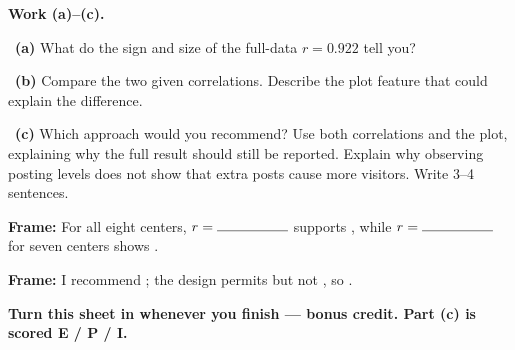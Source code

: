 \documentclass[11pt]{article}
\begin{document}
\newpage
\textbf{Work (a)--(c).}\par\smallskip

~\textbf{(a)} What do the sign and size of the full-data $r=0.922$ tell you?\par
\workspace{0.55in}

~\textbf{(b)} Compare the two given correlations. Describe the plot feature that could explain the difference.\par
\workspace{1.1in}

~\textbf{(c)} Which approach would you recommend? Use both correlations and the plot, explaining why the full result should still be reported. Explain why observing posting levels does not show that extra posts cause more visitors. Write 3--4 sentences.\par
\workspace{1.7in}

\begin{sentenceframebox}\raggedright\textbf{Frame:} For all eight centers, $r=\blank[0.7in]$ supports \blank[1.8in], while $r=\blank[0.7in]$ for seven centers shows \blank[1.8in].\end{sentenceframebox}

\begin{sentenceframebox}\raggedright\textbf{Frame:} I recommend \blank[0.8in]; the design permits \blank[1.6in] but not \blank[1.6in], so \blank[1.8in].\end{sentenceframebox}

\textbf{Turn this sheet in whenever you finish --- bonus credit. Part (c) is scored E / P / I.}\par
\end{document}
